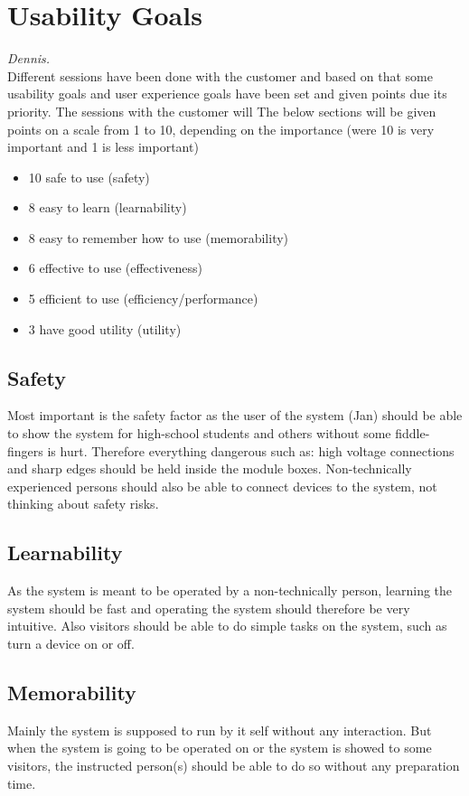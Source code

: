 \section{Usability Goals}\textit{Dennis.}\\
Different sessions have been done with the customer and based on that some usability goals and user experience goals have been set and given points due its priority. The sessions with the customer will 
The below sections will be given points on a scale from 1 to 10, depending on
the importance (were 10 is very important and 1 is less important)
\begin{itemize}
	\item 10 safe to use (safety)
	\item 8 easy to learn (learnability) 
	\item 8 easy to remember how to use (memorability)
	\item 6 effective to use (effectiveness) 
	\item 5 efficient to use (efficiency/performance)
	\item 3 have good utility (utility)	
\end{itemize}
\subsection{Safety}
Most important is the safety factor as the user of the system (Jan) should be able to show the system for high-school students and others without some fiddle-fingers is hurt. Therefore everything dangerous such as: high voltage connections and sharp edges should be held inside the module boxes.
Non-technically experienced persons should also be able to connect devices to the system, not thinking about safety risks. 
\subsection{Learnability}
As the system is meant to be operated by a non-technically person, learning the system should be fast and operating the system should therefore be very intuitive. 
Also visitors should be able to do simple tasks on the system, such as turn a device on or off.
\subsection{Memorability}
Mainly the system is supposed to run by it self without any interaction. But when the system is going to be operated on or the system is showed to some visitors, the instructed person(s) should be able to do so without any preparation time.
